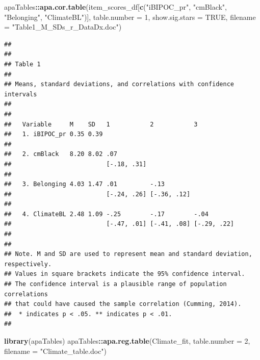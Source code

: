 \documentclass[
  11pt,
]{book}
\newenvironment{Shaded}{\begin{snugshade}}{\end{snugshade}}
\newcommand{\AttributeTok}[1]{\textcolor[rgb]{0.27,0.27,0.27}{#1}}
\newcommand{\ConstantTok}[1]{\textcolor[rgb]{0.37,0.37,0.37}{#1}}
\newcommand{\DecValTok}[1]{\textcolor[rgb]{0.06,0.06,0.06}{#1}}
\newcommand{\FunctionTok}[1]{\textcolor[rgb]{0.27,0.27,0.27}{\textbf{#1}}}
\newcommand{\NormalTok}[1]{#1}
\newcommand{\SpecialCharTok}[1]{\textcolor[rgb]{0.43,0.43,0.43}{\textbf{#1}}}
\newcommand{\StringTok}[1]{\textcolor[rgb]{0.5,0.5,0.5}{#1}}
\begin{document}
\begin{Shaded}
\begin{Highlighting}[]
\NormalTok{apaTables}\SpecialCharTok{::}\FunctionTok{apa.cor.table}\NormalTok{(item\_scores\_df[}\FunctionTok{c}\NormalTok{(}\StringTok{"iBIPOC\_pr"}\NormalTok{, }\StringTok{"cmBlack"}\NormalTok{, }\StringTok{"Belonging"}\NormalTok{, }\StringTok{"ClimateBL"}\NormalTok{)], }\AttributeTok{table.number =} \DecValTok{1}\NormalTok{, }\AttributeTok{show.sig.stars =} \ConstantTok{TRUE}\NormalTok{, }\AttributeTok{filename =} \StringTok{"Table1\_M\_SDs\_r\_DataDx.doc"}\NormalTok{)}
\end{Highlighting}
\end{Shaded}

\begin{verbatim}
## 
## 
## Table 1 
## 
## Means, standard deviations, and correlations with confidence intervals
##  
## 
##   Variable     M    SD   1           2           3          
##   1. iBIPOC_pr 0.35 0.39                                    
##                                                             
##   2. cmBlack   8.20 8.02 .07                                
##                          [-.18, .31]                        
##                                                             
##   3. Belonging 4.03 1.47 .01         -.13                   
##                          [-.24, .26] [-.36, .12]            
##                                                             
##   4. ClimateBL 2.48 1.09 -.25        -.17        -.04       
##                          [-.47, .01] [-.41, .08] [-.29, .22]
##                                                             
## 
## Note. M and SD are used to represent mean and standard deviation, respectively.
## Values in square brackets indicate the 95% confidence interval.
## The confidence interval is a plausible range of population correlations 
## that could have caused the sample correlation (Cumming, 2014).
##  * indicates p < .05. ** indicates p < .01.
## 
\end{verbatim}

\begin{Shaded}
\begin{Highlighting}[]
\FunctionTok{library}\NormalTok{(apaTables)}
\NormalTok{apaTables}\SpecialCharTok{::}\FunctionTok{apa.reg.table}\NormalTok{(Climate\_fit, }\AttributeTok{table.number =} \DecValTok{2}\NormalTok{, }\AttributeTok{filename =} \StringTok{"Climate\_table.doc"}\NormalTok{)}
\end{Highlighting}
\end{Shaded}
\end{document}
